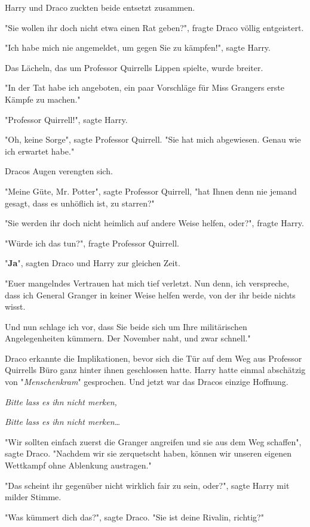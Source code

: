 {Harry und Draco zuckten beide entsetzt zusammen.

"Sie wollen ihr doch nicht etwa einen Rat geben?", fragte Draco völlig entgeistert.

"Ich habe mich nie angemeldet, um gegen Sie zu kämpfen!", sagte Harry.

Das Lächeln, das um Professor Quirrells Lippen spielte, wurde breiter.

"In der Tat habe ich angeboten, ein paar Vorschläge für Miss Grangers erste Kämpfe zu machen."

"Professor Quirrell!", sagte Harry.

"Oh, keine Sorge", sagte Professor Quirrell. "Sie hat mich abgewiesen. Genau wie ich erwartet habe."

Dracos Augen verengten sich.

"Meine Güte, Mr. Potter", sagte Professor Quirrell, "hat Ihnen denn nie jemand gesagt, dass es unhöflich ist, zu starren?"

"Sie werden ihr doch nicht heimlich auf andere Weise helfen, oder?", fragte Harry.

"Würde ich das tun?", fragte Professor Quirrell.

"\textbf{Ja}", sagten Draco und Harry zur gleichen Zeit.

"Euer mangelndes Vertrauen hat mich tief verletzt. Nun denn, ich verspreche, dass ich General Granger in keiner Weise helfen werde, von der ihr beide nichts wisst.

Und nun schlage ich vor, dass Sie beide sich um Ihre militärischen Angelegenheiten kümmern. Der November naht, und zwar schnell."

Draco erkannte die Implikationen, bevor sich die Tür auf dem Weg aus Professor Quirrells Büro ganz hinter ihnen geschlossen hatte. Harry hatte einmal abschätzig von "\emph{Menschenkram}" gesprochen. Und jetzt war das Dracos einzige Hoffnung.

\emph{Bitte lass es ihn nicht merken,}

\emph{Bitte lass es ihn nicht merken…}

"Wir sollten einfach zuerst die Granger angreifen und sie aus dem Weg schaffen", sagte Draco. "Nachdem wir sie zerquetscht haben, können wir unseren eigenen Wettkampf ohne Ablenkung austragen."

"Das scheint ihr gegenüber nicht wirklich fair zu sein, oder?", sagte Harry mit milder Stimme.

"Was kümmert dich das?", sagte Draco. "Sie ist deine Rivalin, richtig?"

}
